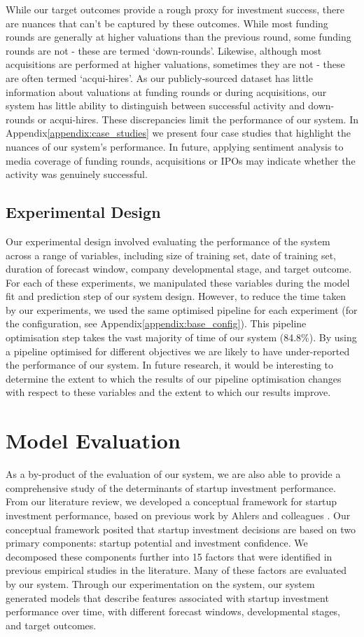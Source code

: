 \documentclass[../thesis/thesis.tex]{subfiles}
\begin{document}
While our target outcomes provide a rough proxy for investment success, there are nuances that can't be captured by these outcomes. While most funding rounds are generally at higher valuations than the previous round, some funding rounds are not - these are termed `down-rounds'. Likewise, although most acquisitions are performed at higher valuations, sometimes they are not - these are often termed `acqui-hires'. As our publicly-sourced dataset has little information about valuations at funding rounds or during acquisitions, our system has little ability to distinguish between successful activity and down-rounds or acqui-hires. These discrepancies limit the performance of our system. In Appendix\ref{appendix:case_studies} we present four case studies that highlight the nuances of our system's performance. In future, applying sentiment analysis to media coverage of funding rounds, acquisitions or IPOs may indicate whether the activity was genuinely successful.

\subsection{Experimental Design}

Our experimental design involved evaluating the performance of the system across a range of variables, including size of training set, date of training set, duration of forecast window, company developmental stage, and target outcome. For each of these experiments, we manipulated these variables during the model fit and prediction step of our system design. However, to reduce the time taken by our experiments, we used the same optimised pipeline for each experiment (for the configuration, see Appendix\ref{appendix:base_config}). This pipeline optimisation step takes the vast majority of time of our system (84.8\%). By using a pipeline optimised for different objectives we are likely to have under-reported the performance of our system. In future research, it would be interesting to determine the extent to which the results of our pipeline optimisation changes with respect to these variables and the extent to which our results improve.

\section{Model Evaluation}

As a by-product of the evaluation of our system, we are also able to provide a comprehensive study of the determinants of startup investment performance. From our literature review, we developed a conceptual framework for startup investment performance, based on previous work by Ahlers and colleagues \cite{ahlers2015}. Our conceptual framework posited that startup investment decisions are based on two primary components: startup potential and investment confidence. We decomposed these components further into 15 factors that were identified in previous empirical studies in the literature. Many of these factors are evaluated by our system. Through our experimentation on the system, our system generated models that describe features associated with startup investment performance over time, with different forecast windows, developmental stages, and target outcomes.
\end{document}
